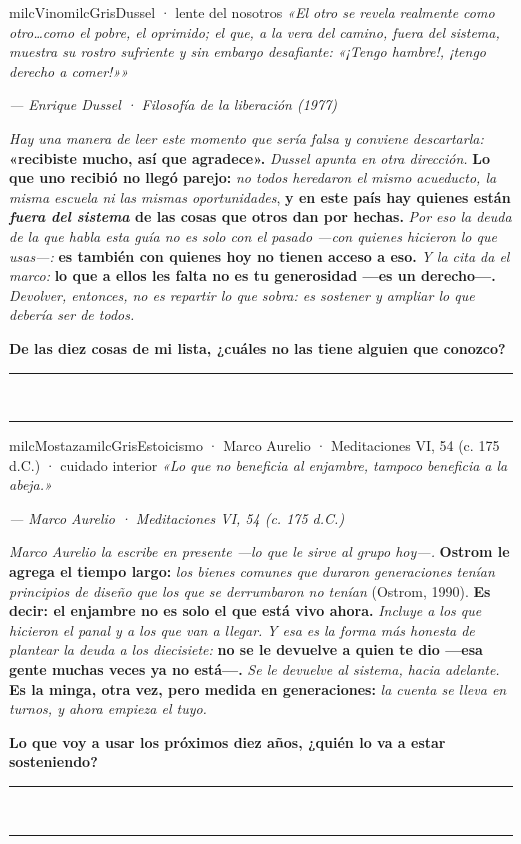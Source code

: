 \documentclass[11pt,letterpaper]{article}
\newcommand{\linead}[1]{\noindent\color{milcLinea}\rule{#1}{0.5pt}\color{milcNegro}}
\begin{document}
\begin{softbox}{milcVino}{milcGris}{Dussel · lente del nosotros}
\textit{«El otro se revela realmente como otro\ldots como el pobre, el oprimido; el que, a la vera del camino, fuera del sistema, muestra su rostro sufriente y sin embargo desafiante: «¡Tengo hambre!, ¡tengo derecho a comer!»»}

{\footnotesize\itshape\color{milcNegro!70}--- Enrique Dussel · Filosofía de la liberación (1977)}

\emph{Hay una manera de leer este momento que sería falsa y conviene descartarla:} \textbf{«recibiste mucho, así que agradece».} \emph{Dussel apunta en otra dirección.} \textbf{Lo que uno recibió no llegó parejo:} \emph{no todos heredaron el mismo acueducto, la misma escuela ni las mismas oportunidades}, \textbf{y en este país hay quienes están \emph{fuera del sistema} de las cosas que otros dan por hechas.} \emph{Por eso la deuda de la que habla esta guía no es solo con el pasado ---con quienes hicieron lo que usas---:} \textbf{es también con quienes hoy no tienen acceso a eso.} \emph{Y la cita da el marco:} \textbf{lo que a ellos les falta no es tu generosidad ---es un derecho---.} \emph{Devolver, entonces, no es repartir lo que sobra: es sostener y ampliar lo que debería ser de todos.}

\textbf{De las diez cosas de mi lista, ¿cuáles no las tiene alguien que conozco?}
\end{softbox}
\linead{\linewidth}\\[1mm]
\linead{\linewidth}

\begin{softbox}{milcMostaza}{milcGris}{Estoicismo · Marco Aurelio · Meditaciones VI, 54 (c. 175 d.C.) · cuidado interior}
\textit{«Lo que no beneficia al enjambre, tampoco beneficia a la abeja.»}

{\footnotesize\itshape\color{milcNegro!70}--- Marco Aurelio · Meditaciones VI, 54 (c. 175 d.C.)}

\emph{Marco Aurelio la escribe en presente ---lo que le sirve al grupo hoy---.} \textbf{Ostrom le agrega el tiempo largo:} \emph{los bienes comunes que duraron generaciones tenían principios de diseño que los que se derrumbaron no tenían} (Ostrom, 1990). \textbf{Es decir: el enjambre no es solo el que está vivo ahora.} \emph{Incluye a los que hicieron el panal y a los que van a llegar.} \emph{Y esa es la forma más honesta de plantear la deuda a los diecisiete:} \textbf{no se le devuelve a quien te dio ---esa gente muchas veces ya no está---.} \emph{Se le devuelve al sistema, hacia adelante.} \textbf{Es la minga, otra vez, pero medida en generaciones:} \emph{la cuenta se lleva en turnos, y ahora empieza el tuyo.}

\textbf{Lo que voy a usar los próximos diez años, ¿quién lo va a estar sosteniendo?}
\end{softbox}
\linead{\linewidth}\\[1mm]
\linead{\linewidth}
\end{document}
